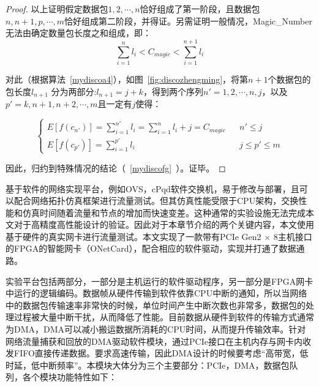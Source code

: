 \begin{proof}
	以上证明假定数据包$ 1,2,\cdots,n $恰好组成了第一阶段，且数据包$ n,n+1,p,\cdots,m $恰好组成第二阶段，并得证。另需证明一般情况，Magic\_Number无法由确定数量包长度之和组成，即：
	\begin{equation} \label{mydiscofi}
	\sum_{i=1}^{n}l_i < C_{magic} < \sum_{i=1}^{n+1}l_i
	\end{equation}
	

	
	对此（根据算法~\ref{mydiscoa4}），如图~\ref{fig:discozhengming}，将第$ n+1 $个数据包的包长度$ l_{n+1} $ 分为两部分:$ l_{n+1}=j+k $，得到两个序列$ n'=1,2,\cdots,n,j $，以及$ p'=k,n+1,n+2,\cdots,m $且一定有$ j $使得：
	
	\begin{equation} \label{mydiscofk}
	\left\{
	\begin{array}{rcl}
	E[f(c_{n'})]=\sum_{i=1}^{n'}l_i=\sum_{i=1}^{n}l_i+j=C_{magic}         &      & {n' \leq j} \\
	E[f(c_{p'})] =\sum_{i=1}^{p'} l_i     &      & {j\leq p' \leq m}
	\end{array} \right. 
	\end{equation}
	
	因此，归约到特殊情况的结论（~\ref{mydiscofg}~）。证毕。
\end{proof}

 \label{chap36}

基于软件的网络实现平台，例如OVS，cPqd软件交换机，易于修改与部署，且可以配合网络拓扑仿真框架进行流量测试。但其仿真性能受限于CPU架构，交换性能和仿真时间随着流量和节点的增加而快速变差。这种通常的实验设施无法完成本文对于高精度高性能设计的验证。因此对于本章节介绍的两个关键内容，本文使用基于硬件的真实网卡进行流量测试。本文实现了一款带有PCIe Gen2 $ \times $ 8主机接口的FPGA的智能网卡（ONetCard），配合相应的软件驱动，实现并打通了数据通路。

\label{chap361}

实验平台包括两部分，一部分是主机运行的软件驱动程序，另一部分是FPGA网卡中运行的逻辑编码。数据帧从硬件传输到软件依靠CPU中断的通知，所以当网络中的数据包传输速率非常快的时候，单位时间产生中断次数也非常多，数据包的处理过程被大量中断干扰，从而降低了性能。目前数据从硬件到软件的传输方式通常为DMA，DMA可以减小搬运数据所消耗的CPU时间，从而提升传输效率。针对网络流量捕获和回放的DMA驱动软件模块，通过PCIe接口在主机内存与网卡内收发FIFO直接传递数据。要求高速传输，因此DMA设计的时候要考虑“高带宽，低时延，低中断频率”。本模块大体分为三个主要部分：PCIe，DMA，数据包队列，各个模块功能特性如下：

